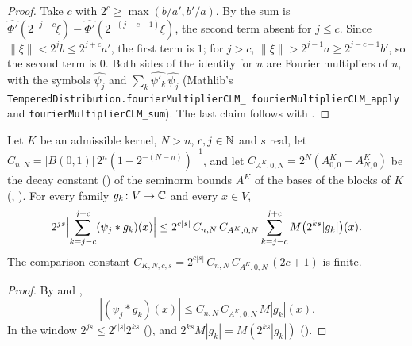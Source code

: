 \begin{proof}
\leanok
Take $c$ with $2^c \geq \max(b/a', b'/a)$. By  the sum is
$\widehat{\Phi'}(2^{-j-c} \xi) - \widehat{\Phi'}(2^{-(j-c-1)} \xi)$, the second term absent for
$j \leq c$. Since $\|\xi\| < 2^j b \leq 2^{j+c} a'$, the first term is $1$; for $j > c$,
$\|\xi\| > 2^{j-1} a \geq 2^{j-c-1} b'$, so the second term is $0$. Both sides of the identity for
$u$ are Fourier multipliers of $u$, with the symbols $\widehat{\psi_j}$ and
$\sum_k \widehat{\psi'_k} \, \widehat{\psi_j}$ (Mathlib's
\texttt{TemperedDistribution.\allowbreak fourierMultiplierCLM\_\allowbreak
fourierMultiplierCLM\_\allowbreak apply} and \texttt{fourierMultiplierCLM\_\allowbreak sum}).
The last claim follows with .
\end{proof}

\begin{lemma}
\label{lem:lp-kernel-pointwise}
\leanok
{}
Let $K$ be an admissible kernel, $N > n$, $c, j \in \mathbb{N}$ and $s$ real, let
$C_{n,N} = |B(0, 1)| \, 2^n (1 - 2^{-(N - n)})^{-1}$, and let
$C_{A^K,0,N} = 2^N (A^K_{0,0} + A^K_{N,0})$ be the decay constant ()
of the seminorm bounds $A^K$ of the bases of the blocks of $K$ (,
). For every family $g_k \colon V \to \mathbb{C}$ and every $x \in V$,
\[
  2^{js} \Bigl| \sum_{k = j - c}^{j + c} (\psi_j * g_k)(x) \Bigr|
  \leq 2^{c|s|} \, C_{n,N} \, C_{A^K,0,N} \sum_{k = j - c}^{j + c} M\bigl(2^{ks} |g_k|\bigr)(x) .
\]
The comparison constant $C_{K,N,c,s} = 2^{c|s|} \, C_{n,N} \, C_{A^K,0,N} \, (2c + 1)$ is
finite.
\end{lemma}

\begin{proof}
\leanok
By  and ,
\[
  |(\psi_j * g_k)(x)| \leq C_{n,N} \, C_{A^K,0,N} \, M|g_k|(x) .
\]
In the window
$2^{js} \leq 2^{c|s|} 2^{ks}$ (), and $2^{ks} M|g_k| = M(2^{ks} |g_k|)$
().
\end{proof}


